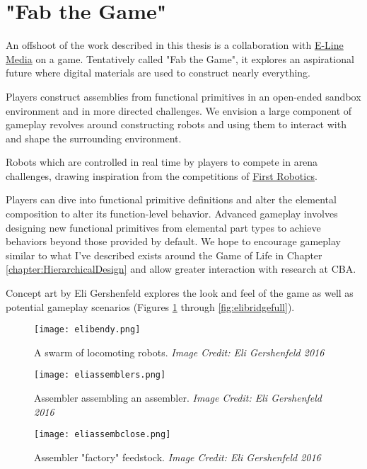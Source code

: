 {\section{"Fab the Game"}

An offshoot of the work described in this thesis is a collaboration with \href{http://elinemedia.com/}{E-Line Media} on a game.  Tentatively called "Fab the Game", it explores an aspirational future where digital materials are used to construct nearly everything.  

Players construct assemblies from functional primitives in an open-ended sandbox environment and in more directed challenges.  We envision a large component of gameplay revolves around constructing robots and using them to interact with and shape the surrounding environment.


Robots which are controlled in real time by players to compete in arena challenges, drawing inspiration from the competitions of \href{http://www.firstinspires.org/robotics/frc}{First Robotics}.


Players can dive into functional primitive definitions and alter the elemental composition to alter its function-level behavior.  Advanced gameplay involves designing new functional primitives from elemental part types to achieve behaviors beyond those provided by default.  We hope to encourage gameplay similar to what I've described exists around the Game of Life in Chapter \ref{chapter:HierarchicalDesign} and allow greater interaction with research at CBA.

Concept art by Eli Gershenfeld explores the look and feel of the game as well as potential gameplay scenarios (Figures \ref{fig:elibendy} through \ref{fig:elibridgefull}).

\begin{figure}
  \texttt{[image: elibendy.png]}
  \caption{A swarm of locomoting robots.  \textit{Image Credit: Eli Gershenfeld 2016}}
  \label{fig:elibendy}
\end{figure}

\begin{figure}
  \texttt{[image: eliassemblers.png]}
  \caption{Assembler assembling an assembler.  \textit{Image Credit: Eli Gershenfeld 2016}}
  \label{fig:eliassemblers}
\end{figure}

\begin{figure}
  \texttt{[image: eliassembclose.png]}
  \caption{Assembler "factory" feedstock.  \textit{Image Credit: Eli Gershenfeld 2016}}
  \label{fig:eliassembclose}
\end{figure}

}
